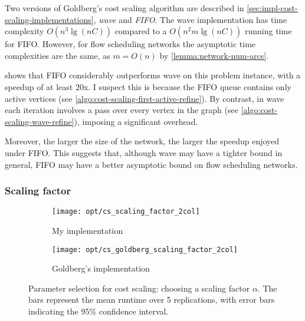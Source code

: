 Two versions of Goldberg's cost scaling algorithm are described in \cref{sec:impl-cost-scaling-implementations}, \emph{wave} and \emph{FIFO}. The wave implementation has time complexity $O\left(n^3 \lg \left(nC\right)\right)$ compared to a $O\left(n^2m\lg\left(nC\right)\right)$ running time for FIFO. However, for flow scheduling networks the asymptotic time complexities are the same, as $m = O(n)$ by \cref{lemma:network-num-arcs}. 

 shows that FIFO considerably outperforms wave on this problem instance, with a speedup of at least 20x. I suspect this is because the FIFO queue contains only active vertices (see \cref{algo:cost-scaling-first-active-refine}). By contrast, in wave each iteration involves a pass over every vertex in the graph (see \cref{algo:cost-scaling-wave-refine}), imposing a significant overhead.

Moreover, the larger the size of the network, the larger the speedup enjoyed under FIFO. This suggests that, although wave may have a tighter bound in general, FIFO may have a better asymptotic bound on flow scheduling networks.


\subsubsection{Scaling factor}

\begin{figure}
    \begin{widepage}
    \begin{subfigure}[c]{0.5\textwidth}
        \texttt{[image: opt/cs\_scaling\_factor\_2col]}
        \caption{My implementation}
    \end{subfigure}
    \begin{subfigure}[c]{0.5\textwidth}
        \texttt{[image: opt/cs\_goldberg\_scaling\_factor\_2col]}
        \caption{Goldberg's implementation}
    \end{subfigure}
    \end{widepage}
    \caption[Parameter selection for cost scaling]{Parameter selection for cost scaling: choosing a scaling factor $\alpha$. The bars represent the mean runtime over 5 replications, with error bars indicating the 95\% confidence interval.}
    \label{fig:opt-cs-scaling-factor}
\end{figure}

